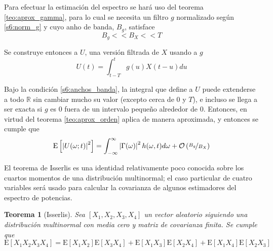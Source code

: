 \documentclass[12pt,letterpaper]{book}
\newtheorem{teorema}{Teorema}[chapter]
\newcommand{\R}{\mathbb{R}}
\newcommand{\intR}{\int_{-\infty}^{\infty}}
\newcommand{\E}[1]{\mathrm{E}\left[ #1 \right]}
\newcommand{\abso}[1]{\left| #1 \right|}
\newcommand{\orden}[1]{\mathcal{O}\left( #1 \right)}
\begin{document}
Para efectuar la estimación del espectro se hará uso del teorema \ref{teo:aprox_gamma}, para lo cual se necesita un filtro $g$ normalizado según \ref{s6:norm_g} y cuyo anho de banda, $B_g$, satisface
\begin{equation}
B_g << B_X << T
\label{s6:anchos_banda}
\end{equation}

Se construye entonces a $U$, una versión filtrada de $X$ usando a $g$
\begin{equation}
U(t) = \int_{t-T}^{t} g(u) X(t-u) du
\end{equation}

Bajo la condición \ref{s6:anchos_banda}, la integral que define a $U$ puede extenderse a todo $\R$ sin cambiar mucho su valor (excepto cerca de 0 y $T$), e incluso se llega a ser exacta si $g$ es 0 fuera de un intervalo pequeño alrededor de 0. Entonces, en virtud del teorema \ref{teo:aprox_orden}
aplica de manera aproximada, y entonces se cumple que
\begin{equation}
\E{\abso{U(\omega; t)}^{2}} = \intR \abso{\Gamma(\omega)}^{2} h(\omega, t)d\omega + \orden{\nicefrac{B_g}{B_X}}
\end{equation}


El teorema de Isserlis es una identidad relativamente poco conocida sobre los cuartos momentos de una distribución multinormal; el caso particular de cuatro variables será usado para calcular la covarianza de algunos estimadores del espectro de potencias.

\begin{teorema}[Isserlis]
Sea $[X_1, X_2, X_3, X_4]$ un vector aleatorio siguiendo una distribución multinormal con media cero y matriz de covarianza finita. Se cumple que
\begin{equation}
\E{X_1 X_2 X_3 X_4} = \E{X_1 X_2} \E{X_3 X_4} + \E{X_1 X_3} \E{X_2 X_4} + \E{X_1 X_4} \E{X_2 X_3}
\end{equation}
\label{teo:isserlis}
\end{teorema}

%
\end{document}
